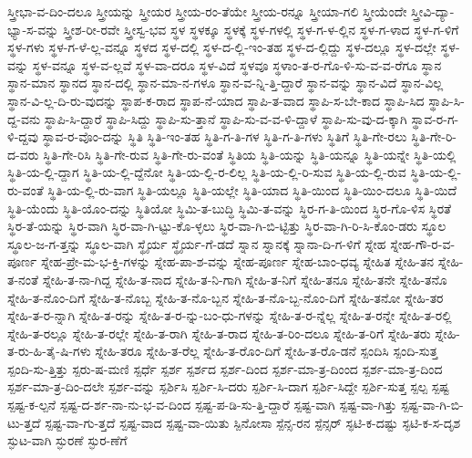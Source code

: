 {ಸ್ತ್ರೀಭಾ-ವ-ದಿಂ-ದಲೂ
ಸ್ತ್ರೀಯನ್ನು
ಸ್ತ್ರೀಯರ
ಸ್ತ್ರೀಯ-ರಂ-ತೆಯೇ
ಸ್ತ್ರೀಯ-ರನ್ನೂ
ಸ್ತ್ರೀಯಾ-ಗಲಿ
ಸ್ತ್ರೀಯೆಂದೇ
ಸ್ತ್ರೀವಿ-ದ್ಯಾ-ಭ್ಯಾ-ಸ-ವನ್ನು
ಸ್ತ್ರೀಶ-ರೀ-ರವೇ
ಸ್ತ್ರೀಸ್ವ-ಭವ
ಸ್ಥಳ
ಸ್ಥಳಕ್ಕೂ
ಸ್ಥಳಕ್ಕೆ
ಸ್ಥಳ-ಗಳಲ್ಲಿ
ಸ್ಥಳ-ಗ-ಳ-ಲ್ಲಿನ
ಸ್ಥಳ-ಗ-ಳಾದ
ಸ್ಥಳ-ಗ-ಳಿಗೆ
ಸ್ಥಳ-ಗಳು
ಸ್ಥಳ-ಗ-ಳೆ-ಲ್ಲ-ವನ್ನೂ
ಸ್ಥಳದ
ಸ್ಥಳ-ದಲ್ಲಿ
ಸ್ಥಳ-ದ-ಲ್ಲಿ-ಇಂ-ತಹ
ಸ್ಥಳ-ದ-ಲ್ಲಿದ್ದು
ಸ್ಥಳ-ದಲ್ಲೂ
ಸ್ಥಳ-ದಲ್ಲೇ
ಸ್ಥಳ-ವನ್ನು
ಸ್ಥಳ-ವನ್ನೂ
ಸ್ಥಳ-ವ-ಲ್ಲವೆ
ಸ್ಥಳ-ವಾ-ದರೂ
ಸ್ಥಳ-ವಿದೆ
ಸ್ಥಳವೂ
ಸ್ಥಳಾಂ-ತ-ರ-ಗೊ-ಳಿ-ಸು-ವ-ವ-ರೆಗೂ
ಸ್ಥಾನ
ಸ್ಥಾನ-ಮಾನ
ಸ್ಥಾನದ
ಸ್ಥಾನ-ದಲ್ಲಿ
ಸ್ಥಾನ-ಮಾ-ನ-ಗಳೂ
ಸ್ಥಾನ-ವ-ನ್ನಿ-ತ್ತಿ-ದ್ದಾರೆ
ಸ್ಥಾನ-ವನ್ನು
ಸ್ಥಾನ-ವಿದೆ
ಸ್ಥಾನ-ವಿಲ್ಲ
ಸ್ಥಾನ-ವಿ-ಲ್ಲ-ದಿ-ರು-ವುದನ್ನು
ಸ್ಥಾಪ-ಕ-ರಾದ
ಸ್ಥಾಪ-ನೆ-ಯಾದ
ಸ್ಥಾಪಿ-ತ-ವಾದ
ಸ್ಥಾಪಿ-ಸ-ಬೇ-ಕಾದ
ಸ್ಥಾಪಿ-ಸಿದ
ಸ್ಥಾಪಿ-ಸಿ-ದ್ದ-ವನು
ಸ್ಥಾಪಿ-ಸಿ-ದ್ದಾರೆ
ಸ್ಥಾಪಿ-ಸಿದ್ದು
ಸ್ಥಾಪಿ-ಸು-ತ್ತಾನೆ
ಸ್ಥಾಪಿ-ಸು-ವ-ವ-ಳಿ-ದ್ದಾಳೆ
ಸ್ಥಾಪಿ-ಸು-ವು-ದ-ಕ್ಕಾಗಿ
ಸ್ಥಾವ-ರ-ಗ-ಳಿ-ದ್ದವು
ಸ್ಥಾವ-ರ-ವೊಂ-ದನ್ನು
ಸ್ಥಿತಿ
ಸ್ಥಿತಿ-ಇಂ-ತಹ
ಸ್ಥಿತಿ-ಗ-ತಿ-ಗಳ
ಸ್ಥಿತಿ-ಗ-ತಿ-ಗಳು
ಸ್ಥಿತಿಗೆ
ಸ್ಥಿತಿ-ಗೇ-ರಲು
ಸ್ಥಿತಿ-ಗೇ-ರಿ-ದ-ವರು
ಸ್ಥಿತಿ-ಗೇ-ರಿಸಿ
ಸ್ಥಿತಿ-ಗೇ-ರುವ
ಸ್ಥಿತಿ-ಗೇ-ರು-ವಂತೆ
ಸ್ಥಿತಿಯ
ಸ್ಥಿತಿ-ಯನ್ನು
ಸ್ಥಿತಿ-ಯನ್ನೂ
ಸ್ಥಿತಿ-ಯನ್ನೇ
ಸ್ಥಿತಿ-ಯಲ್ಲಿ
ಸ್ಥಿತಿ-ಯ-ಲ್ಲಿ-ದ್ದಾಗ
ಸ್ಥಿತಿ-ಯ-ಲ್ಲಿ-ದ್ದೆನೋ
ಸ್ಥಿತಿ-ಯ-ಲ್ಲಿ-ರ-ಲಿಲ್ಲ
ಸ್ಥಿತಿ-ಯ-ಲ್ಲಿ-ರಿ-ಸುವ
ಸ್ಥಿತಿ-ಯ-ಲ್ಲಿ-ರುವ
ಸ್ಥಿತಿ-ಯ-ಲ್ಲಿ-ರು-ವಂತೆ
ಸ್ಥಿತಿ-ಯ-ಲ್ಲಿ-ರು-ವಾಗ
ಸ್ಥಿತಿ-ಯಲ್ಲೂ
ಸ್ಥಿತಿ-ಯಲ್ಲೇ
ಸ್ಥಿತಿ-ಯಾದ
ಸ್ಥಿತಿ-ಯಿಂದ
ಸ್ಥಿತಿ-ಯಿಂ-ದಲೂ
ಸ್ಥಿತಿ-ಯಿದೆ
ಸ್ಥಿತಿ-ಯೆಂದು
ಸ್ಥಿತಿ-ಯೊಂ-ದನ್ನು
ಸ್ಥಿತಿಯೋ
ಸ್ಥಿಮಿ-ತ-ಬುದ್ಧಿ
ಸ್ಥಿಮಿ-ತ-ವನ್ನು
ಸ್ಥಿರ-ಗ-ತಿ-ಯಿಂದ
ಸ್ಥಿರ-ಗೊ-ಳಿಸ
ಸ್ಥಿರತೆ
ಸ್ಥಿರ-ತೆ-ಯನ್ನು
ಸ್ಥಿರ-ವಾಗಿ
ಸ್ಥಿರ-ವಾ-ಗಿ-ಟ್ಟು-ಕೊ-ಳ್ಳಲು
ಸ್ಥಿರ-ವಾ-ಗಿ-ಬಿ-ಟ್ಟಿತ್ತು
ಸ್ಥಿರ-ವಾ-ಗಿ-ರಿ-ಸಿ-ಕೊಂ-ಡರು
ಸ್ಥೂಲ
ಸ್ಥೂಲ-ಜ-ಗ-ತ್ತನ್ನು
ಸ್ಥೂಲ-ವಾಗಿ
ಸ್ಥೈರ್ಯ
ಸ್ಥೈರ್ಯ-ಗೆ-ಡದೆ
ಸ್ನಾನ
ಸ್ನಾನಕ್ಕೆ
ಸ್ನಾನಾ-ದಿ-ಗ-ಳಿಗೆ
ಸ್ನೇಹ
ಸ್ನೇಹ-ಗೌ-ರ-ವ-ಪೂರ್ಣ
ಸ್ನೇಹ-ಪ್ರೇ-ಮ-ಭ-ಕ್ತಿ-ಗಳನ್ನು
ಸ್ನೇಹ-ಪಾ-ಶ-ವನ್ನು
ಸ್ನೇಹ-ಪೂರ್ಣ
ಸ್ನೇಹ-ಬಾಂ-ಧವ್ಯ
ಸ್ನೇಹಿತ
ಸ್ನೇಹಿ-ತನ
ಸ್ನೇಹಿ-ತ-ನಂತೆ
ಸ್ನೇಹಿ-ತ-ನಾ-ಗಿದ್ದ
ಸ್ನೇಹಿ-ತ-ನಾದ
ಸ್ನೇಹಿ-ತ-ನಿ-ಗಾಗಿ
ಸ್ನೇಹಿ-ತ-ನಿಗೆ
ಸ್ನೇಹಿ-ತನೂ
ಸ್ನೇಹಿ-ತನೇ
ಸ್ನೇಹಿ-ತನೊ
ಸ್ನೇಹಿ-ತ-ನೊಂ-ದಿಗೆ
ಸ್ನೇಹಿ-ತ-ನೊಬ್ಬ
ಸ್ನೇಹಿ-ತ-ನೊ-ಬ್ಬನ
ಸ್ನೇಹಿ-ತ-ನೊ-ಬ್ಬ-ನೊಂ-ದಿಗೆ
ಸ್ನೇಹಿ-ತನೋ
ಸ್ನೇಹಿ-ತರ
ಸ್ನೇಹಿ-ತ-ರ-ನ್ನಾಗಿ
ಸ್ನೇಹಿ-ತ-ರನ್ನು
ಸ್ನೇಹಿ-ತ-ರ-ನ್ನು-ಬಂ-ಧು-ಗಳನ್ನು
ಸ್ನೇಹಿ-ತ-ರ-ನ್ನೆಲ್ಲ
ಸ್ನೇಹಿ-ತ-ರನ್ನೇ
ಸ್ನೇಹಿ-ತ-ರಲ್ಲಿ
ಸ್ನೇಹಿ-ತ-ರಲ್ಲೂ
ಸ್ನೇಹಿ-ತ-ರಲ್ಲೇ
ಸ್ನೇಹಿ-ತ-ರಾಗಿ
ಸ್ನೇಹಿ-ತ-ರಾದ
ಸ್ನೇಹಿ-ತ-ರಿಂ-ದಲೂ
ಸ್ನೇಹಿ-ತ-ರಿಗೆ
ಸ್ನೇಹಿ-ತರು
ಸ್ನೇಹಿ-ತ-ರು-ಹಿ-ತೈ-ಷಿ-ಗಳು
ಸ್ನೇಹಿ-ತರೂ
ಸ್ನೇಹಿ-ತ-ರೆಲ್ಲ
ಸ್ನೇಹಿ-ತ-ರೊಂ-ದಿಗೆ
ಸ್ನೇಹಿ-ತ-ರೊ-ಡನೆ
ಸ್ಪಂದಿಸಿ
ಸ್ಪಂದಿ-ಸುತ್ತ
ಸ್ಪಂದಿ-ಸು-ತ್ತಿತ್ತು
ಸ್ಪರು-ಷ-ಮಣಿ
ಸ್ಪರ್ಧೆ
ಸ್ಪರ್ಶ
ಸ್ಪರ್ಶದ
ಸ್ಪರ್ಶ-ದಿಂದ
ಸ್ಪರ್ಶ-ಮಾ-ತ್ರ-ದಿಂಂದ
ಸ್ಪರ್ಶ-ಮಾ-ತ್ರ-ದಿಂದ
ಸ್ಪರ್ಶ-ಮಾ-ತ್ರ-ದಿಂ-ದಲೇ
ಸ್ಪರ್ಶ-ವನ್ನು
ಸ್ಪರ್ಶಿಸಿ
ಸ್ಪರ್ಶಿ-ಸಿ-ದರು
ಸ್ಪರ್ಶಿ-ಸಿ-ದಾಗ
ಸ್ಪರ್ಶಿ-ಸಿದ್ದೇ
ಸ್ಪರ್ಶಿ-ಸುತ್ತ
ಸ್ಪಲ್ಪ
ಸ್ಪಷ್ಟ
ಸ್ಪಷ್ಟ-ಕ-ಲ್ಪನೆ
ಸ್ಪಷ್ಟ-ದ-ರ್ಶ-ನಾ-ನು-ಭ-ವ-ದಿಂದ
ಸ್ಪಷ್ಟ-ಪ-ಡಿ-ಸು-ತ್ತಿ-ದ್ದಾರೆ
ಸ್ಪಷ್ಟ-ವಾಗಿ
ಸ್ಪಷ್ಟ-ವಾ-ಗಿತ್ತು
ಸ್ಪಷ್ಟ-ವಾ-ಗಿ-ಬಿ-ಟು-ತ್ತದೆ
ಸ್ಪಷ್ಟ-ವಾ-ಗು-ತ್ತದೆ
ಸ್ಪಷ್ಟ-ವಾದ
ಸ್ಪಷ್ಟ-ವಾ-ಯಿತು
ಸ್ಪಿನೋಸಾ
ಸ್ಪೆನ್ಸ-ರನ
ಸ್ಪೆನ್ಸರ್
ಸ್ಫಟಿ-ಕ-ದಷ್ಟು
ಸ್ಫಟಿ-ಕ-ಸ-ದೃಶ
ಸ್ಫುಟ-ವಾಗಿ
ಸ್ಫುರಣೆ
ಸ್ಫುರ-ಣೆಗೆ
}
